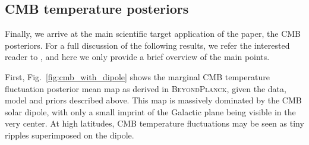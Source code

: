\documentclass[twocolumn]{aa}
\newcommand{\BP}{\textsc{BeyondPlanck}}
\begin{document}
\subsection{CMB temperature posteriors}
\label{sec:cmb_params}

Finally, we arrive at the main scientific target application of the
paper, the CMB posteriors. For a full discussion of the following
results, we refer the interested reader to \citet{bp11,bp12}, and here
we only provide a brief overview of the main points.

First, Fig.~\ref{fig:cmb_with_dipole} shows the marginal CMB
temperature fluctuation posterior mean map as derived in \BP, given
the data, model and priors described above. This map is massively
dominated by the CMB solar dipole, with only a small imprint of the
Galactic plane being visible in the very center. At high latitudes,
CMB temperature fluctuations may be seen as tiny ripples superimposed
on the dipole.
\end{document}
